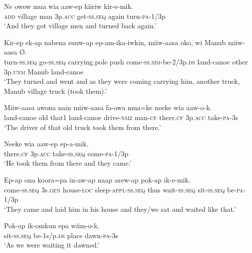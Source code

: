 \ea
\gll  Ne  owow  mua  wia  aaw-ep  kiiriw  kir-e-mik. \\
\textsc{add}  village  man  3p.\textsc{acc}  get-\textsc{ss.seq}  again  turn-\textsc{pa}-1/3p \\
\glt ‘And they got village men and turned back again.’ \\
\z


\ea
\gll  Kir-ep  ek-ap  nabena  suuw-ap  ep-am-ika-iwkin,                miiw-aasa  oko,  wi  Manub  miiw-aasa  Ø. \\
turn-\textsc{ss.seq}  go-\textsc{ss.seq}  carrying.pole  push  come-\textsc{ss}.\textsc{sim}-be-2/3p.\textsc{ds}   land-canoe  other  3p.\textsc{unm}  Manub  land-canoe \\


\glt ‘They turned and went and as they were coming carrying him, another truck, Manub village truck (took them).’ \\
\z


\ea
\gll  Miiw-aasa  awona  nain  miiw-aasa  fa-owa  mua=ke  neeke   wia  aaw-o-k. \\
land-canoe  old  that1  land-canoe  drive-\textsc{nmz}  man-\textsc{cf}  there.\textsc{cf}  3p.\textsc{acc}  take-\textsc{pa}-3s \\


\glt ‘The driver of that old truck took them from there.’ \\
\z


\ea
\gll  Neeke  wia  aaw-ep  ep-a-mik. \\
there.\textsc{cf}  3p.\textsc{acc}  take-\textsc{ss.seq}  come-\textsc{pa}-1/3p \\
\glt ‘He took them from there and they came.’ \\
\z


\ea
\gll  Ep-ap  ona  koora=pa  in-aw-ap  naap              arew-ap  pok-ap  ik-e-mik. \\
come-\textsc{ss.seq}  3s.\textsc{gen}  house-\textsc{loc}  sleep-\textsc{appl}-\textsc{ss.seq}  thus wait-\textsc{ss.seq}  sit-\textsc{ss.seq}  be-\textsc{pa}-1/3p \\


\glt ‘They came and laid him in his house and they/we sat and waited like that.’ \\
\z


\ea
\gll  Pok-ap  ik-omkun  epa  wiim-o-k. \\
sit-\textsc{ss.seq}  be-1s/p.\textsc{ds}  place  dawn-\textsc{pa}-3s \\
\glt ‘As we were waiting it dawned.’ \\
\z


